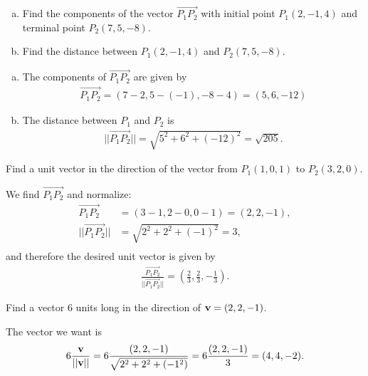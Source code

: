 \documentclass[12pt,letterpaper,reqno]{article}
\numberwithin{equation}{section}
\begin{document}
\begin{exercise}
\begin{enumerate}[(a)]
	\item Find the components of the vector $\overrightarrow{P_1P_2}$ with initial point $P_1(2,-1,4)$ and terminal point $P_2(7,5,-8)$.
	\item Find the distance between $P_1(2,-1,4)$ and $P_2(7,5,-8)$.
\end{enumerate}	
\end{exercise}

{\color{red}  
\begin{enumerate}[(a)]
	\item The components of $\overrightarrow{P_1P_2}$ are given by
	\begin{align*}
		\overrightarrow{P_1P_2}=(7-2,5-(-1),-8-4)=(5,6,-12)
	\end{align*}
	\item The distance between $P_1$ and $P_2$ is 
	\begin{align*}
		||\overrightarrow{P_1P_2}||=\sqrt{5^2+6^2+(-12)^2}=\sqrt{205}.
	\end{align*}
\end{enumerate}}

\begin{exercise}
Find a unit vector in the direction of the vector from $P_1(1,0,1)$ to $P_2(3,2,0)$.
\end{exercise}

{\color{red} 
We find $\overrightarrow{P_1P_2}$ and normalize:
\begin{align*}
	\overrightarrow{P_1P_2}&=(3-1,2-0,0-1)=(2,2,-1), \\
	||\overrightarrow{P_1P_2}||&=\sqrt{2^2+2^2+(-1)^2}=3, \\
\end{align*}
and therefore the desired unit vector is given by
\begin{align*}
	\frac{\overrightarrow{P_1P_2}}{||\overrightarrow{P_1P_2}||}=(\frac{2}{3},\frac{2}{3},-\frac{1}{3}).
\end{align*}}

\begin{exercise}
Find a vector 6 units long in the direction of ${\bf v}=(2,2,-1)$.	
\end{exercise}

{\color{red} 
The vector we want is 
\begin{align*}
6\frac{{\bf v}}{||{\bf v}||}=6\frac{(2,2,-1)}{\sqrt{2^2+2^2+(-1^2)}}=6\frac{(2,2,-1)}{3}=(4,4,-2).	
\end{align*}
}
\end{document}
